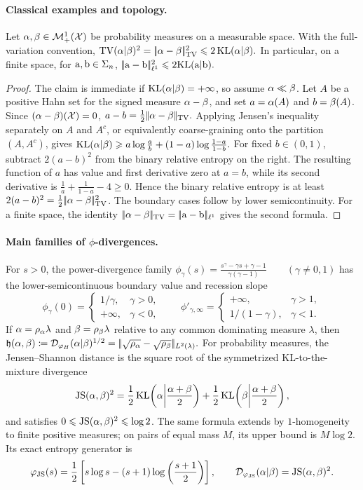 \paragraph{Classical examples and topology.}
\begin{thm}\label{thm-pinsker}
Let $\alpha,\beta\in\mathcal{M}_+^1(\mathcal{X})$ be probability measures on a measurable space. With the full-variation convention, \(\operatorname{TV}(\alpha|\beta)^2 = |\!| \alpha-\beta |\!|_{\operatorname{TV}}^2 \leqslant 2\operatorname{KL}(\alpha|\beta).\)
In particular, on a finite space, for $\mathrm{a},\mathrm{b}\in\Sigma_n$, \(|\!| \mathrm{a}-\mathrm{b} |\!|_{\ell^1}^2 \leqslant 2\mathrm{KL}(\mathrm{a}|\mathrm{b}).\)
\end{thm}
\begin{proof}
The claim is immediate if $\operatorname{KL}(\alpha|\beta)=+\infty$, so assume $\alpha\ll\beta$. Let $A$ be a positive Hahn set for the signed measure $\alpha-\beta$, and set $a=\alpha(A)$ and $b=\beta(A)$. Since $(\alpha-\beta)(\mathcal{X})=0$,
\(a-b = \frac12|\!| \alpha-\beta |\!|_{\operatorname{TV}}.\)
Applying Jensen's inequality separately on $A$ and $A^c$, or equivalently coarse-graining onto the partition $(A,A^c)$, gives \(\operatorname{KL}(\alpha|\beta) \geqslant a\log\frac{a}{b} +(1-a)\log\frac{1-a}{1-b}.\)
For fixed $b\in(0,1)$, subtract $2(a-b)^2$ from the binary relative entropy on the right. The resulting function of $a$ has value and first derivative zero at $a=b$, while its second derivative is \(\frac1a+\frac1{1-a}-4\geq0.\)
Hence the binary relative entropy is at least $2(a-b)^2=\frac12|\!| \alpha-\beta |\!|_{\operatorname{TV}}^2$. The boundary cases follow by lower semicontinuity. For a finite space, the identity $|\!| \alpha-\beta |\!|_{\operatorname{TV}}=|\!| \mathrm{a}-\mathrm{b} |\!|_{\ell^1}$ gives the second formula.
\end{proof}
\paragraph{\texorpdfstring{Main families of $\phi$-divergences.}{Main families of phi-divergences.}}
For $s>0$, the power-divergence family
\(\phi_\gamma(s)=\frac{s^\gamma-\gamma s+\gamma-1}{\gamma(\gamma-1)} \qquad(\gamma\neq0,1)\)
has the lower-semicontinuous boundary value and recession slope
\[
\phi_\gamma(0)=
\begin{cases}1/\gamma,&\gamma>0,\\+\infty,&\gamma<0,\end{cases}
\qquad
\phi'_{\gamma,\infty}=
\begin{cases}+\infty,&\gamma>1,\\1/(1-\gamma),&\gamma<1.\end{cases}
\]
If $\alpha=\rho_\alpha\lambda$ and $\beta=\rho_\beta\lambda$ relative to any common dominating measure $\lambda$, then
\(\mathfrak{h}(\alpha,\beta) \coloneqq\mathcal{D}_{\varphi_H}(\alpha|\beta)^{1/2} =|\!| \sqrt{\rho_\alpha}-\sqrt{\rho_\beta} |\!|_{L^2(\lambda)}.\)
For probability measures, the Jensen--Shannon distance is the square root of the symmetrized KL-to-the-mixture divergence
\[
\operatorname{JS}(\alpha,\beta)^2
=
\frac12\operatorname{KL}\!\left(\alpha\middle|\frac{\alpha+\beta}{2}\right)
+
\frac12\operatorname{KL}\!\left(\beta\middle|\frac{\alpha+\beta}{2}\right),
\]
and satisfies $0\leqslant\operatorname{JS}(\alpha,\beta)^2\leqslant\log 2$. The same formula extends by $1$-homogeneity to finite positive measures; on pairs of equal mass $M$, its upper bound is $M\log 2$. Its exact entropy generator is
\[
\varphi_{\operatorname{JS}}(s)
=\frac12\left[s\log s-(s+1)\log\left( \frac{s+1}{2} \right)\right],
\qquad
\mathcal{D}_{\varphi_{\operatorname{JS}}}(\alpha|\beta)=\operatorname{JS}(\alpha,\beta)^2.
\]
